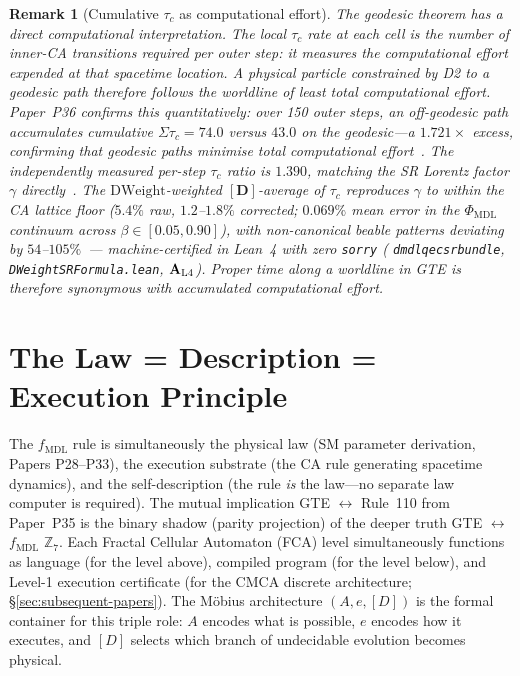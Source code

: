 \documentclass[12pt,letterpaper]{article}
\newtheorem{remark}[theorem]{Remark}
\newcommand{\fmdl}{f_{\mathrm{MDL}}}
\newcommand{\Zseven}{\mathbb{Z}_7}
\newcommand{\Dclass}{[D]}
\newcommand{\catAL}{\ensuremath{\textbf{A}_{\rm L4}}}
\newcommand{\lean}[1]{%
  \penalty-100
  \begingroup\def\_{\textunderscore\allowbreak}\texttt{#1}\endgroup}
\begin{document}
\begin{remark}[Cumulative $\tau_c$ as computational effort]
\label{rem:tau_c_effort}
The geodesic theorem has a direct computational interpretation. The local $\tau_c$
rate at each cell is the number of inner-CA transitions required per outer step: it
measures the computational effort expended at that spacetime location. A physical
particle constrained by D2 to a geodesic path therefore follows the worldline of
\emph{least total computational effort}. Paper~P36 confirms this quantitatively:
over 150 outer steps, an off-geodesic path accumulates cumulative $\Sigma\tau_c = 74.0$
versus $43.0$ on the geodesic---a $1.721\times$ excess, confirming that geodesic paths
minimise total computational effort~\cite{SpivackEmergentGravity}.
The independently measured per-step $\tau_c$ ratio is $1.390$, matching the SR Lorentz
factor $\gamma$ directly~\cite{SpivackEmergentGravity}.
The $\mathrm{DWeight}$-weighted $[\mathbf{D}]$-average of $\tau_c$ reproduces $\gamma$
to within the CA lattice floor ($5.4\%$ raw, $1.2$--$1.8\%$ corrected;
$0.069\%$ mean error in the $\Phi_{\mathrm{MDL}}$ continuum across $\beta\in[0.05,0.90]$),
with non-canonical beable patterns deviating by $54$--$105\%$~---
machine-certified in Lean~4 with zero \texttt{sorry}
(\lean{dmdl\_qec\_sr\_bundle}, \texttt{DWeightSRFormula.lean}, $\catAL$).
Proper time along a worldline in GTE is therefore synonymous with accumulated computational effort.
\end{remark}

\section{The Law = Description = Execution Principle}
\label{sec:law-description-execution}

The $\fmdl$ rule is simultaneously the physical law (SM parameter derivation,
Papers P28--P33), the execution substrate (the CA rule generating spacetime
dynamics), and the self-description (the rule \emph{is} the law---no separate
law computer is required).
The mutual implication GTE $\leftrightarrow$ Rule~110 from Paper~P35 is the
binary shadow (parity projection) of the deeper truth GTE $\leftrightarrow$
$\fmdl$ $\Zseven$.
Each Fractal Cellular Automaton (FCA) level simultaneously functions as
language (for the level above), compiled program (for the level below), and
Level-1 execution certificate (for the CMCA discrete architecture;
\S\ref{sec:subsequent-papers}).
The M\"{o}bius architecture $(A, e, \Dclass)$ is the formal container for this triple
role: $A$ encodes what is possible, $e$ encodes how it executes, and $\Dclass$
selects which branch of undecidable evolution becomes physical.
\end{document}
